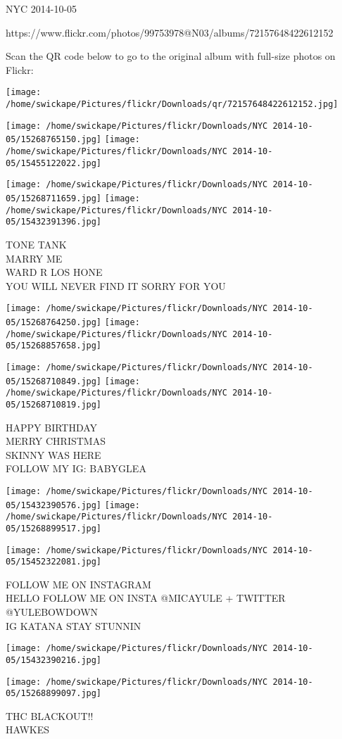 \documentclass[10pt,letterpaper]{article}
\begin{document}
NYC 2014-10-05

https://www.flickr.com/photos/99753978@N03/albums/72157648422612152

Scan the QR code below to go to the original album with full-size photos on Flickr:

\texttt{[image: /home/swickape/Pictures/flickr/Downloads/qr/72157648422612152.jpg]}
\pagebreak

\texttt{[image: /home/swickape/Pictures/flickr/Downloads/NYC 2014-10-05/15268765150.jpg]}
\texttt{[image: /home/swickape/Pictures/flickr/Downloads/NYC 2014-10-05/15455122022.jpg]}

\texttt{[image: /home/swickape/Pictures/flickr/Downloads/NYC 2014-10-05/15268711659.jpg]}
\texttt{[image: /home/swickape/Pictures/flickr/Downloads/NYC 2014-10-05/15432391396.jpg]}

TONE TANK\\
MARRY ME\\
WARD R LOS HONE\\
YOU WILL NEVER FIND IT SORRY FOR YOU\\
\pagebreak

\texttt{[image: /home/swickape/Pictures/flickr/Downloads/NYC 2014-10-05/15268764250.jpg]}
\texttt{[image: /home/swickape/Pictures/flickr/Downloads/NYC 2014-10-05/15268857658.jpg]}

\texttt{[image: /home/swickape/Pictures/flickr/Downloads/NYC 2014-10-05/15268710849.jpg]}
\texttt{[image: /home/swickape/Pictures/flickr/Downloads/NYC 2014-10-05/15268710819.jpg]}

HAPPY BIRTHDAY\\
MERRY CHRISTMAS\\
SKINNY WAS HERE\\
FOLLOW MY IG: BABYGLEA\\
\pagebreak

\texttt{[image: /home/swickape/Pictures/flickr/Downloads/NYC 2014-10-05/15432390576.jpg]}
\texttt{[image: /home/swickape/Pictures/flickr/Downloads/NYC 2014-10-05/15268899517.jpg]}

\vspace{0.25in}
\texttt{[image: /home/swickape/Pictures/flickr/Downloads/NYC 2014-10-05/15452322081.jpg]}

FOLLOW ME ON INSTAGRAM\\
HELLO FOLLOW ME ON INSTA @MICAYULE + TWITTER @YULEBOWDOWN\\
IG KATANA STAY STUNNIN\\
\pagebreak

\texttt{[image: /home/swickape/Pictures/flickr/Downloads/NYC 2014-10-05/15432390216.jpg]}

\vspace{0.25in}
\texttt{[image: /home/swickape/Pictures/flickr/Downloads/NYC 2014-10-05/15268899097.jpg]}

THC BLACKOUT!!\\
HAWKES\\
\pagebreak
\end{document}
